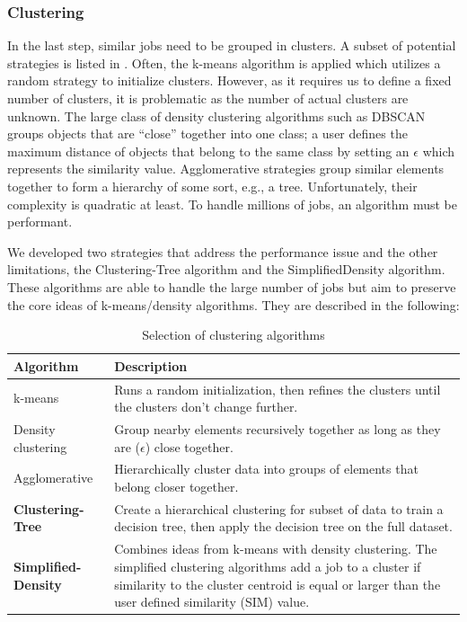\documentclass{jhps}
\begin{document}
\subsubsection{Clustering}
In the last step, similar jobs need to be grouped in clusters.
A subset of potential strategies is listed in .
Often, the k-means algorithm is applied which utilizes a random strategy to initialize clusters.
However, as it requires us to define a fixed number of clusters, it is problematic as the number of actual clusters are unknown.
The large class of density clustering algorithms such as DBSCAN groups objects that are “close” together into one class; a user defines the maximum distance of objects that belong to the same class by setting an $\epsilon$ which represents the similarity value.
Agglomerative strategies group similar elements together to form a hierarchy of some sort, e.g., a tree.
Unfortunately, their complexity is quadratic at least.
To handle millions of jobs, an algorithm must be performant.

We developed two strategies that address the performance issue and the other limitations, the Clustering-Tree algorithm and the SimplifiedDensity algorithm.
These algorithms are able to handle the large number of jobs but aim to preserve the core ideas of k-means/density algorithms.
They are described in the following:

\begin{table}
  \centering
  \begin{tabularx}{\textwidth}{lX}
    Algorithm & Description \\
    \midrule
    k-means & Runs a random initialization, then refines the clusters until the clusters don't change further.\\
    Density clustering &  Group nearby elements recursively together as long as they are ($\epsilon$) close together.\\
    Agglomerative &  Hierarchically cluster data into groups of elements that belong closer together.\\
    \textbf{Clustering-Tree} &  Create a hierarchical clustering for subset of data to train a decision tree, then apply the decision tree on the full dataset.\\
    \textbf{Simplified-Density} &  Combines ideas from k-means with density clustering.
The simplified clustering algorithms add a job to a cluster if similarity to the cluster centroid is equal or larger than the user defined similarity (SIM) value.\\
  \end{tabularx}
  \caption{Selection of clustering algorithms}
  \label{tab:clustering_algorithms}
\end{table}
\end{document}
